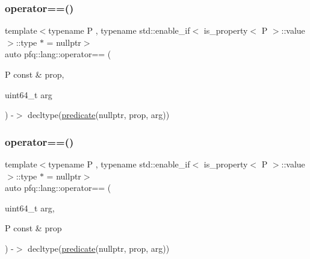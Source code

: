 \subsubsection{\texorpdfstring{operator==()}{operator==()}\hspace{0.1cm}{\footnotesize\ttfamily [1/2]}}
{\footnotesize\ttfamily template$<$typename P , typename std\+::enable\+\_\+if$<$ is\+\_\+property$<$ P $>$\+::value $>$\+::type $\ast$  = nullptr$>$ \\
auto pfq\+::lang\+::operator== (\begin{DoxyParamCaption}\item[{P const \&}]{prop,  }\item[{uint64\+\_\+t}]{arg }\end{DoxyParamCaption}) -\/$>$ decltype(\hyperlink{namespacepfq_1_1lang_aca9adafc436b7f851621b979fa1aaf88}{predicate}(nullptr, prop, arg))
    \hspace{0.3cm}{\ttfamily [inline]}}

\mbox{\label{namespacepfq_1_1lang_a3228fe8e103aaca7682f0256ea6b254c}} 
\subsubsection{\texorpdfstring{operator==()}{operator==()}\hspace{0.1cm}{\footnotesize\ttfamily [2/2]}}
{\footnotesize\ttfamily template$<$typename P , typename std\+::enable\+\_\+if$<$ is\+\_\+property$<$ P $>$\+::value $>$\+::type $\ast$  = nullptr$>$ \\
auto pfq\+::lang\+::operator== (\begin{DoxyParamCaption}\item[{uint64\+\_\+t}]{arg,  }\item[{P const \&}]{prop }\end{DoxyParamCaption}) -\/$>$ decltype(\hyperlink{namespacepfq_1_1lang_aca9adafc436b7f851621b979fa1aaf88}{predicate}(nullptr, prop, arg))
    \hspace{0.3cm}{\ttfamily [inline]}}

\mbox{\label{namespacepfq_1_1lang_a708ca1f29e8dd2461859c46369e89322}} 
